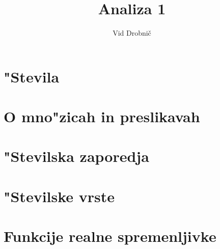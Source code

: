 \documentclass[a4paper, 12pt]{article}
\title{Analiza 1}
\author{Vid Drobnič}
\date{}
\begin{document}
	\maketitle
	\thispagestyle{empty}
	\pagebreak
	\setcounter{page}{1}

	\tableofcontents
	\pagebreak

	\section{"Stevila}
	
	
	\section{O mno"zicah in preslikavah}
	
	
	\section{"Stevilska zaporedja}
	
	
	\section{"Stevilske vrste}
	
	
	\section{Funkcije realne spremenljivke}
	
\end{document}
